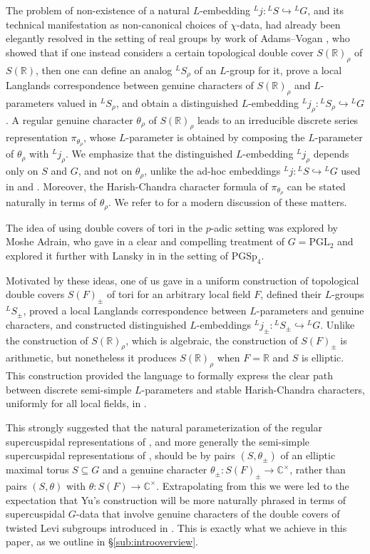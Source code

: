 \documentclass{article}
\def\tx#1{\textrm{#1}}
\def\R{\mathbb{R}}
\def\C{\mathbb{C}}
\theoremstyle{definition}
\numberwithin{equation}{subsection}
\renewcommand{\-}{\hyp{}}
\begin{document}
The problem of non-existence of a natural $L$-embedding $^Lj : {^LS} \hookrightarrow {^LG}$, and its technical manifestation as non-canonical choices of $\chi$-data, had already been elegantly resolved in the setting of real groups by work of Adams--Vogan \cite{AV92}, who showed that if one instead considers a certain topological double cover $S(\R)_\rho$ of $S(\R)$, then one can define an analog $^LS_\rho$ of an $L$-group for it, prove a local Langlands correspondence between genuine characters of $S(\R)_\rho$ and $L$-parameters valued in $^LS_\rho$, and obtain a distinguished $L$-embedding $^Lj_\rho : {^LS}_\rho \hookrightarrow {^LG}$. A regular genuine character $\theta_\rho$ of $S(\R)_\rho$ leads  to an irreducible discrete series representation $\pi_{\theta_\rho}$, whose  $L$-parameter is obtained by composing the $L$-parameter of $\theta_\rho$ with $^Lj_\rho$. We emphasize that the distinguished $L$-embedding $^Lj_\rho$ depends only on $S$ and $G$, and not on $\theta_\rho$, unlike the ad-hoc embeddings $^Lj : {^LS} \hookrightarrow {^LG}$ used in \cite{KalRSP} and \cite{KalSLP}. Moreover, the Harish-Chandra character formula of $\pi_{\theta_\rho}$ can be stated naturally in terms of $\theta_\rho$. We refer to \cite{AV16} for a modern discussion of these matters.

The idea of using double covers of tori in the $p$-adic setting was explored by Moshe Adrain, who gave in \cite{Adrian13} a clear and compelling treatment of $G=\tx{PGL}_2$ and explored it further with Lansky in \cite{AdrianLansky2015} in the setting of $\tx{PGSp}_4$.

Motivated by these ideas, one of us gave in \cite{KalDC} a uniform construction of topological double covers $S(F)_\pm$ of tori for an arbitrary local field $F$, defined their $L$-groups $^LS_\pm$, proved a local Langlands correspondence between $L$\-parameters and genuine characters, and constructed distinguished $L$\-embeddings $^Lj_\pm : {^LS}_\pm \hookrightarrow {^LG}$. Unlike the construction of $S(\R)_\rho$, which is algebraic, the construction of $S(F)_\pm$ is arithmetic, but nonetheless it produces $S(\R)_\rho$ when $F=\R$ and $S$ is elliptic. This construction provided the language to formally express the clear path between discrete semi-simple $L$-parameters and stable Harish-Chandra characters, uniformly for all local fields, in \cite[Conjecture 4.4.1]{KalDC}. 

This strongly suggested that the natural parameterization of the regular supercuspidal representations of \cite{KalRSP}, and more generally the semi-simple supercuspidal representations of \cite{KalSLP}, 
should be by pairs $(S,\theta_\pm)$ of an elliptic maximal torus $S \subseteq G$ and a genuine character $\theta_\pm : S(F)_\pm \to \C^\times$, rather than pairs $(S,\theta)$ with $\theta : S(F) \to \C^\times$. Extrapolating from this we were led to the expectation that Yu's construction will be more naturally phrased in terms of supercuspidal $G$-data that involve genuine characters of the double covers of twisted Levi subgroups introduced in \cite[\S6]{KalDC}. This is exactly what we achieve in this paper, as we outline in \S\ref{sub:introoverview}.
\end{document}
